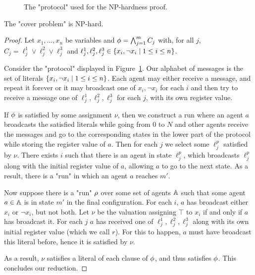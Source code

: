 \begin{figure}[h]
	
	\caption{The "protocol" used for the NP-hardness proof.}
	\label{fig:np-hard}
\end{figure}

\begin{proposition}
	\label{prop:np-hard-query-cover}
	The "cover problem" is NP-hard.
\end{proposition}

\begin{proof}
	Let $x_1, \ldots, x_n$ be variables and $\phi = \bigwedge_{j=1}^m C_j$ with, for all $j$, $C_j = \ell_j^1 \lor \ell_j^2 \lor \ell_j^3$ and $\ell_j^1, \ell_j^2, \ell_j^3 \in \{x_i, \neg x_i \mid 1 \leq i \leq n\}$. 
	
	Consider the "protocol" displayed in Figure~\ref{fig:np-hard}.
	Our alphabet of messages is the set of literals $\{x_i, \neg x_i \mid 1 \leq i \leq n\}$.
	Each agent may either receive a message, and repeat it forever or it may broadcast one of $x_i, \neg x_i$ for each $i$ and then try to receive a message one of $\ell_j^1, \ell_j^2, \ell_j^3$ for each $j$, with its own register value.
	
	If $\phi$ is satisfied by some assignment $\nu$, then we construct a run where an agent $a$ broadcasts the satisfied literals while going from $0$ to $N$ and other agents receive the messages and go to the corresponding states in the lower part of the protocol while storing the register value of $a$.
	Then for each $j$ we select some $\ell_j^p$ satisfied by $\nu$. There exists $i$ such that there is an agent in state $\ell_j^p$, which broadcasts $\ell_j^p$ along with the initial register value of $a$, allowing $a$ to go to the next state.
	As a result, there is a "run" in which an agent $a$ reaches $m'$.
	
	Now suppose there is a "run" $\rho$ over some set of agents $\mathbb{A}$ such that some agent $a \in \mathbb{A}$ is in state $m'$ in the final configuration.
	For each $i$, $a$ has broadcast either $x_i$ or $\neg x_i$, but not both.
	Let $\nu$ be the valuation assigning $\top$ to $x_i$ if and only if $a$ has broadcast it.
	For each $j$ $a$ has received one of $\ell_j^1, \ell_j^2, \ell_j^3$ along with its own initial register value (which we call $r$). For this to happen, $a$ must have broadcast this literal before, hence it is satisfied by $\nu$.
	
	As a result, $\nu$ satisfies a literal of each clause of $\phi$, and thus satisfies $\phi$. This concludes our reduction.
\end{proof}

